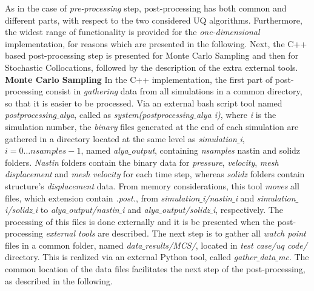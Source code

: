 	As in the case of \emph{pre-processing} step, post-processing has both common and different parts, with respect to the two considered UQ algorithms. Furthermore, the widest range of functionality is provided for the \emph{one-dimensional} implementation, for reasons which are presented in the following. Next, the C++ based post-processing step is presented for Monte Carlo Sampling and then for Stochastic Collocations, followed by the description of the extra external tools.
\newline
\textbf{Monte Carlo Sampling}
\newline
	In the C++ implementation, the first part of post-processing consist in \emph{gathering} data from all simulations in a common directory, so that it is easier to be processed. Via an external bash script tool named \emph{postprocessing$\_$alya}, called as \emph{system(postprocessing$\_$alya i)}, where \emph{i} is the simulation number, the \emph{binary} files generated at the end of each simulation are gathered in a directory located at the same level as \emph{simulation$\_$i}, $i = 0 \ldots nsamples - 1$, named \emph{alya$\_$output}, containing \emph{nsamples} nastin and solidz folders. \emph{Nastin} folders contain the binary data for \emph{pressure}, \emph{velocity}, \emph{mesh displacement} and \emph{mesh velocity} for each time step, whereas \emph{solidz} folders contain structure's \emph{displacement} data. From memory considerations, this tool \emph{moves} all files, which extension contain \emph{.post.}, from \emph{simulation$\_$i/nastin$\_$i} and \emph{simulation$\_$i/solidz$\_$i} to \emph{alya$\_$output/nastin$\_$i} and \emph{alya$\_$output/solidz$\_$i}, respectively. The processing of this files is done externally and it is be presented when the post-processing \emph{external tools} are described. The next step is to gather all \emph{watch point} files in a common folder, named \emph{data$\_$results/MCS/}, located in \emph{test case/uq code/} directory. This is realized via an external Python tool, called \emph{gather$\_$data$\_$mc}. The common location of the data files facilitates the next step of the post-processing, as described in the following.

